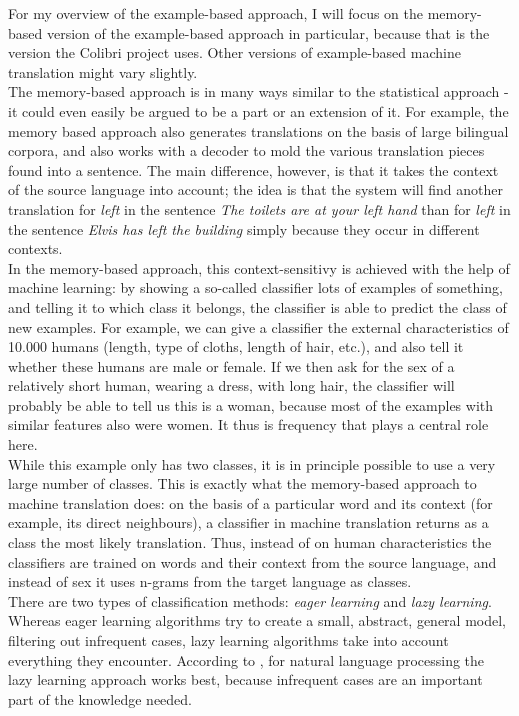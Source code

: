 \documentclass[12pt]{article}
\begin{document}
For my overview of the example-based approach, I will focus on the memory-based version of the example-based approach in particular, because that is the version the Colibri project uses. Other versions of example-based machine translation might vary slightly. \\\indent
The memory-based approach is in many ways similar to the statistical approach - it could even easily be argued to be a part or an extension of it. For example, the memory based approach also generates translations on the basis of large bilingual corpora, and also works with a decoder to mold the various translation pieces found into a sentence. The main difference, however, is that it takes the context of the source language into account; the idea is that the system will find another translation for \emph{left} in the sentence \emph{The toilets are at your left hand} than for \emph{left} in the sentence \emph{Elvis has left the building} simply because they occur in different contexts. \\\indent
In the memory-based approach, this context-sensitivy is achieved with the help of machine learning: by showing a so-called classifier lots of examples of something, and telling it to which class it belongs, the classifier is able to predict the class of new examples. For example, we can give a classifier the external characteristics of 10.000 humans (length, type of cloths, length of hair, etc.), and also tell it whether these humans are male or female. If we then ask for the sex of a relatively short human, wearing a dress, with long hair, the classifier will probably be able to tell us this is a woman, because most of the examples with similar features also were women. It thus is frequency that plays a central role here.\\\indent
While this example only has two classes, it is in principle possible to use a very large number of classes. This is exactly what the memory-based approach to machine translation does: on the basis of a particular word and its context (for example, its direct neighbours), a classifier in machine translation returns as a class the most likely translation. Thus, instead of on human characteristics the classifiers are trained on words and their context from the source language, and instead of sex it uses n-grams from the target language as classes. \\\indent
There are two types of classification methods: \emph{eager learning} and \emph{lazy learning}. Whereas eager learning algorithms try to create a small, abstract, general model, filtering out infrequent cases, lazy learning algorithms take into account everything they encounter. According to \citet{dvdb05}, for natural language processing the lazy learning approach works best, because infrequent cases are an important part of the knowledge needed. \\\indent
\end{document}
